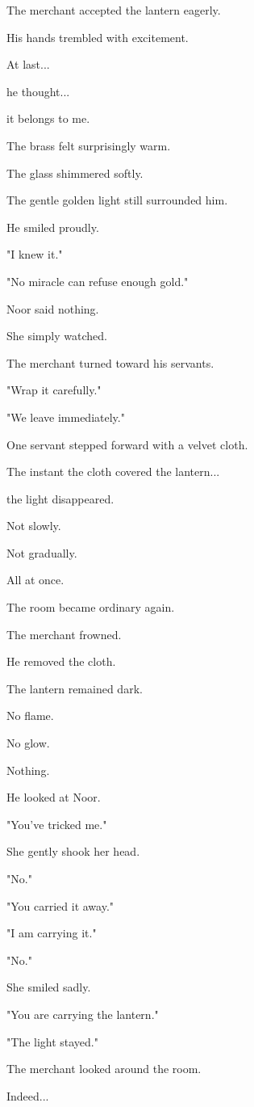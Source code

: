 \documentclass[12pt,openany]{book}
\begin{document}
The merchant accepted the lantern eagerly.

His hands trembled with excitement.

At last...

he thought...

it belongs to me.

The brass felt surprisingly warm.

The glass shimmered softly.

The gentle golden light still surrounded him.

He smiled proudly.

"I knew it."

"No miracle can refuse enough gold."

Noor said nothing.

She simply watched.

The merchant turned toward his servants.

"Wrap it carefully."

"We leave immediately."

One servant stepped forward with a velvet cloth.

The instant the cloth covered the lantern...

the light disappeared.

Not slowly.

Not gradually.

All at once.

The room became ordinary again.

The merchant frowned.

He removed the cloth.

The lantern remained dark.

No flame.

No glow.

Nothing.

He looked at Noor.

"You've tricked me."

She gently shook her head.

"No."

"You carried it away."

"I am carrying it."

"No."

She smiled sadly.

"You are carrying the lantern."

"The light stayed."

The merchant looked around the room.

Indeed...
\end{document}
